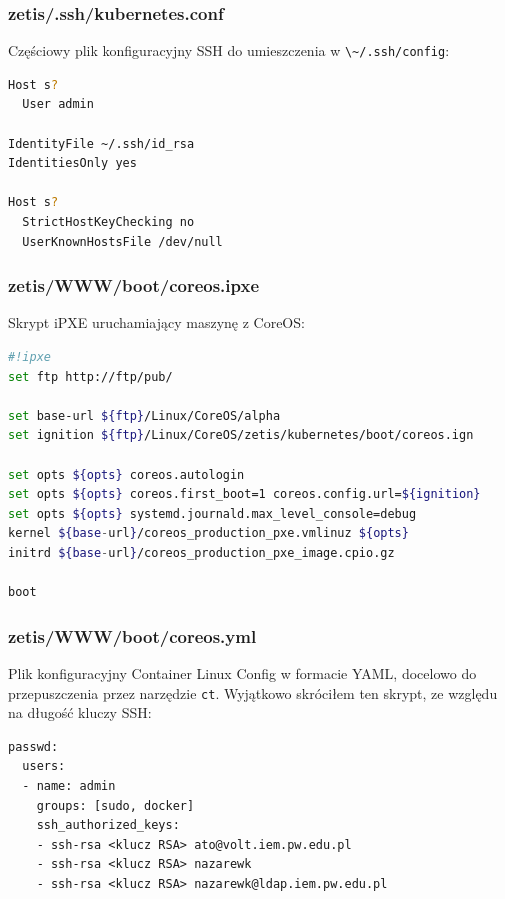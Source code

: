 \documentclass[a4paper,12pt,twoside,openany]{report}
\newcommand{\passthrough}[1]{#1}
\begin{document}
\hypertarget{zetis.sshkubernetes.conf}{%
\subsubsection{zetis/.ssh/kubernetes.conf}\label{zetis.sshkubernetes.conf}}

Częściowy plik konfiguracyjny SSH do umieszczenia w
\passthrough{\lstinline!\~/.ssh/config!}:

\begin{lstlisting}[language=bash]
Host s?
  User admin

IdentityFile ~/.ssh/id_rsa
IdentitiesOnly yes

Host s?
  StrictHostKeyChecking no
  UserKnownHostsFile /dev/null
\end{lstlisting}

\hypertarget{zetiswwwbootcoreos.ipxe}{%
\subsubsection{zetis/WWW/boot/coreos.ipxe}\label{zetiswwwbootcoreos.ipxe}}

Skrypt iPXE uruchamiający maszynę z CoreOS:

\begin{lstlisting}[language=bash]
#!ipxe
set ftp http://ftp/pub/

set base-url ${ftp}/Linux/CoreOS/alpha
set ignition ${ftp}/Linux/CoreOS/zetis/kubernetes/boot/coreos.ign

set opts ${opts} coreos.autologin
set opts ${opts} coreos.first_boot=1 coreos.config.url=${ignition}
set opts ${opts} systemd.journald.max_level_console=debug
kernel ${base-url}/coreos_production_pxe.vmlinuz ${opts}
initrd ${base-url}/coreos_production_pxe_image.cpio.gz

boot
\end{lstlisting}

\hypertarget{zetiswwwbootcoreos.yml}{%
\subsubsection{zetis/WWW/boot/coreos.yml}\label{zetiswwwbootcoreos.yml}}

Plik konfiguracyjny Container Linux Config w formacie YAML, docelowo do
przepuszczenia przez narzędzie \passthrough{\lstinline!ct!}. Wyjątkowo
skróciłem ten skrypt, ze względu na długość kluczy SSH:

\begin{lstlisting}
passwd:
  users:
  - name: admin
    groups: [sudo, docker]
    ssh_authorized_keys:
    - ssh-rsa <klucz RSA> ato@volt.iem.pw.edu.pl
    - ssh-rsa <klucz RSA> nazarewk
    - ssh-rsa <klucz RSA> nazarewk@ldap.iem.pw.edu.pl
\end{lstlisting}
\end{document}
